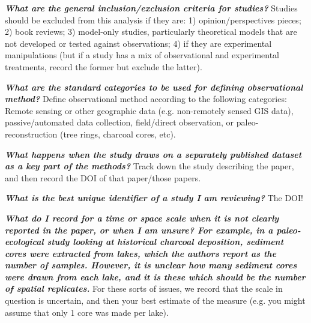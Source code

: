 \documentclass[12pt]{article}
\begin{document}
\begin{enumerate}
  \Hitem \emph{\textbf{What are the general inclusion/exclusion criteria for studies?}} Studies should be excluded from this analysis if they are: 1) opinion/perspectives pieces; 2) book reviews; 3) model-only studies, particularly theoretical models that are not developed or tested against observations; 4) if they are experimental manipulations (but if a study has a mix of observational and experimental treatments, record the former but exclude the latter).
  
  \Hitem \emph{\textbf{What are the standard categories to be used for defining observational method?}} Define observational method according to the following categories: Remote sensing or other geographic data (e.g. non-remotely sensed GIS data), passive/automated data collection, field/direct observation, or paleo-reconstruction (tree rings, charcoal cores, etc).

  \Hitem \emph{\textbf{What happens when the study draws on a separately published dataset as a key part of the methods?}} Track down the study describing the paper, and then record the DOI of that paper/those papers.
  
  \Hitem \emph{\textbf{What is the best unique identifier of a study I am reviewing?}} The DOI! 
  
  \Hitem \emph{\textbf{What do I record for a time or space scale when it is not clearly reported in the paper, or when I am unsure? For example, in a paleo-ecological study looking at historical charcoal deposition, sediment cores were extracted from lakes, which the authors report as the number of samples. However, it is unclear how many sediment cores were drawn from each lake, and it is these which should be the number of spatial replicates.}} For these sorts of issues, we record that the scale in question is uncertain, and then your best estimate of the measure (e.g. you might assume that only 1 core was made per lake).


\end{enumerate}
\end{document}
